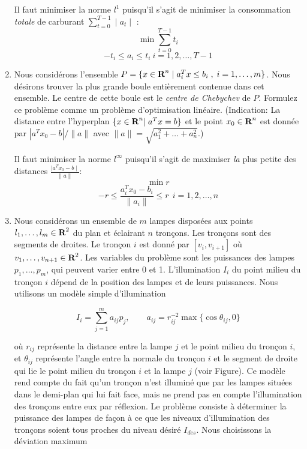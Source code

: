 \begin{enumerate}
    \begin{solution}
      Il faut minimiser la norme $l^{1}$ puisqu'il s'agit de minimiser la consommation \textit{totale} de carburant $\sum_{t=0}^{T-1} \mid a_{t} \mid$ : 
      $$\min \sum_{t=0}^{T-1} t_{i}$$
      $$-t_{i} \le a_{i} \le t_{i}~ i = 1,2,\dots,T-1$$
    \end{solution}



  \item Nous considérons l'ensemble $P=\{ x \in {\mbox{\bf R}}^n \; | \; a_i^T x \leq b_i \; , \;  i=1, \ldots, m \}$. Nous désirons trouver la
    plus grande boule entièrement contenue dans cet ensemble. Le centre de cette boule est  le {\it centre de Chebychev} de $P$.  Formulez
    ce problème comme un problème d'optimisation linéaire. (Indication:  La distance entre l'hyperplan $\{x \in {\mbox{\bf R}}^n | \;  a^Tx=b \}$ et le point $x_0 \in {\mbox{\bf R}}^n$
    est donnée par
    $|a^Tx_0 - b|/\|a\|$ avec $\|a\|=\sqrt{a_1^2+ \ldots + a_n^2}$.)

    \begin{solution}
      Il faut minimiser la norme $l^{\infty}$ puisqu'il s'agit de maximiser \textit{la} plus petite des distances $\frac{\mid a^{T}x_{0} - b \mid}{\|a\|}$: 
      $$ \min r$$
      $$-r \le \frac{a_{i}^{T}x_{0} - b_{i}}{\|a_{i}\|} \le r ~~i = 1,2, \dots, n$$
    \end{solution}





  \item Nous considérons un ensemble de $m$ lampes disposées aux points $l_1, \ldots, l_m \in {\mbox{\bf R}}^2$ du plan et éclairant $n$
    tronçons. Les tronçons sont des segments de droites. Le tronçon $i$ est donné par $[v_i, v_{i+1}]$ où $v_1, \ldots, v_{n+1}
    \in {\mbox{\bf R}}^2$.  Les variables du problème sont les puissances des lampes $p_1, \ldots, p_m$, qui peuvent varier entre 0 et 1.
    L'illumination $I_i$ du point milieu du tronçon $i$ dépend de la position des lampes et de leurs
    puissances. Nous utilisons un modèle simple d'illumination

    $$I_i = \sum_{j=1}^m a_{ij} p_j, \qquad a_{ij}=r_{ij}^{-2} \max \{\cos \theta_{ij}, 0 \}$$

    où $r_{ij}$ représente la distance entre la lampe $j$ et le point milieu du tronçon $i$, et $\theta_{ij}$ représente l'angle
    entre la normale du tronçon $i$ et le segment de droite qui lie le point milieu du tronçon $i$ et la lampe $j$ (voir Figure). Ce
    modèle rend compte du fait qu'un tronçon n'est illuminé que par les lampes situées dans le demi-plan qui lui fait face,
    mais ne prend pas en compte l'illumination des tronçons entre eux par réflexion.  Le problème consiste à déterminer la puissance des lampes de façon à ce
    que les niveaux d'illumination des  tronçons soient tous proches du niveau désiré $I_{des}$. Nous choisissons la déviation maximum


\end{enumerate}
